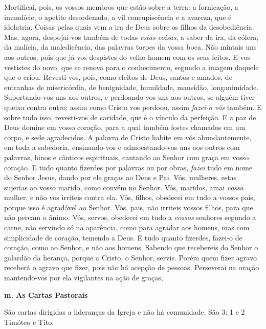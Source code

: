 \documentclass[
]{book}
\begin{document}
Mortificai, pois, os vossos membros que estão sobre a terra: a fornicação, a imundície, o apetite desordenado, a vil concupiscência e a avareza, que é idolatria. Coisas pelas quais vem a ira de Deus sobre os filhos da desobediência. Mas, agora, despojai-vos também de todas \emph{estas coisas}, a saber da ira, da cólera, da malícia, da maledicência, das palavras torpes da vossa boca. Não mintais uns aos outros, pois que já vos despistes do velho homem com os seus feitos, E vos vestistes do novo, que se renova para o conhecimento, segundo a imagem daquele que o criou. Revesti-vos, pois, como eleitos de Deus, santos e amados, de entranhas de misericórdia, de benignidade, humildade, mansidão, longanimidade. Suportando-vos uns aos outros, e perdoando-vos uns aos outros, se alguém tiver queixa contra outro; assim como Cristo vos perdoou, assim \emph{fazei-o vós} também. E sobre tudo isso, revesti-vos de caridade, que é o vínculo da perfeição. E a paz de Deus domine em vosso coração, para a qual também fostes chamados em um corpo, e sede agradecidos. A palavra de Cristo habite em vós abundantemente, em toda a sabedoria, ensinando-vos e admoestando-vos uns aos outros com palavras, hinos e cânticos espirituais, cantando ao Senhor com graça em vosso coração. E tudo quanto fizerdes por palavras ou por obras, \emph{fazei} tudo em nome do Senhor Jesus, dando por ele graças ao Deus e Pai. Vós, mulheres, estas sujeitas ao vosso marido, como convém no Senhor. Vós, maridos, amai \emph{vossa} mulher, e não vos irriteis contra ela. Vós, filhos, obedecei em tudo a vossos pais, porque isso é agradável ao Senhor. Vós, pais, não irriteis vossos filhos, para que não percam o ânimo. Vós, servos, obedecei em tudo a \emph{vossos} senhores segundo a carne, não servindo só na aparência, como para agradar aos homens, mas com simplicidade de coração, temendo a Deus. E tudo quanto fizerdes, fazei-o de coração, como ao Senhor, e não aos homens. Sabendo que recebereis do Senhor o galardão da herança, porque a Cristo, o Senhor, servis. Porém quem fizer agravo receberá o agravo que fizer, pois não há acepção de pessoas. Perseverai na oração mantendo-vos por ela vigilantes na ação de graças,

\textbf{m. As Cartas Pastorais}

São cartas dirigidas a lideranças da Igreja e não há comunidade. São 3: 1 e 2 Timóteo e Tito.
\end{document}
